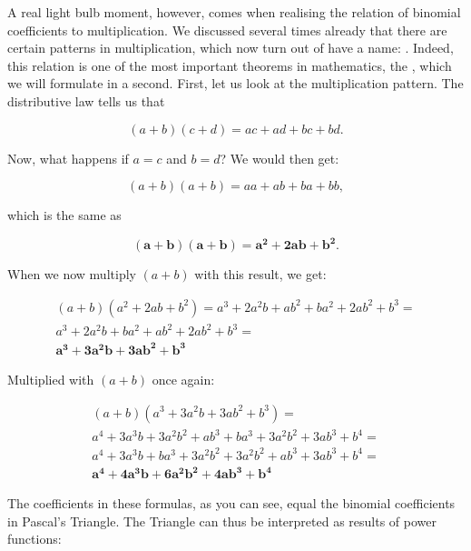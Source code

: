 \documentclass{scrreprt}
\begin{document}
A real light bulb moment, however,
comes when realising 
the relation of binomial coefficients 
to multiplication.
We discussed several times already
that there are certain patterns in
multiplication,
which now turn out of have a name:
.
Indeed, this relation is one of the most important
theorems in mathematics, the ,
which we will formulate in a second.
First, let us look at the multiplication pattern.
The distributive law tells us that

\begin{equation}
(a + b) (c + d) = ac + ad + bc + bd.
\end{equation}

Now, what happens if $a = c$ and $b = d$?
We would then get:

\begin{equation}
(a + b) (a + b) = aa + ab + ba + bb,
\end{equation}

which is the same as

\begin{equation}
\mathbf{(a + b) (a + b) = a^2 + 2ab + b^2}.
\end{equation}

When we now multiply $(a + b)$ with this result, we get:

\begin{equation}
\begin{split}
(a + b) (a^2 + 2ab + b^2) = a^3 + 2a^2b + ab^2 + ba^2 + 2ab^2 + b^3 = \\
a^3 + 2a^2b + ba^2 + ab^2 + 2ab^2 + b^3 = \\
\mathbf{a^3 + 3a^2b + 3ab^2 + b^3} 
\end{split}
\end{equation}

Multiplied with $(a + b)$ once again:

\begin{equation}
\begin{split}
(a + b) (a^3 + 3a^2b + 3ab^2 + b^3) = \\
a^4 + 3a^3b + 3a^2b^2 + ab^3 + ba^3 + 3a^2b^2 + 3ab^3 + b^4 = \\
a^4 + 3a^3b + ba^3 + 3a^2b^2 + 3a^2b^2 + ab^3 + 3ab^3 + b^4 = \\
\mathbf{a^4 + 4a^3b + 6a^2b^2 + 4ab^3 + b^4} 
\end{split}
\end{equation}

The coefficients in these formulas, as you can see, 
equal the binomial coefficients in Pascal's Triangle.
The Triangle can thus be interpreted
as results of power functions:
\end{document}
